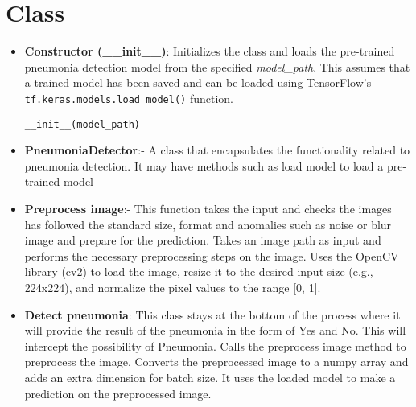 \section{Class}
\begin{itemize}
	\item\textbf{Constructor (\_\_init\_\_)}:
	Initializes the class and loads the pre-trained pneumonia detection model from the specified \textit{model\_path}. This assumes that a trained model has been saved and can be loaded using TensorFlow's \texttt{tf.keras.models.load\_model()} function.
	
	\texttt{\_\_init\_\_(model\_path)}
	
	\item\textbf{ PneumoniaDetector}:- A class that encapsulates the functionality related to pneumonia detection. It may have methods such as load model to load a pre-trained model
	
	
	\item\textbf{Preprocess image}:- This function takes the input and checks the images has followed the standard size, format and anomalies such as noise or blur image and prepare for the prediction. Takes an image path as input and performs the necessary preprocessing steps on the image. Uses the OpenCV library (cv2) to load the image, resize it to the desired input size (e.g., 224x224), and normalize the pixel values to the range [0, 1].
	
	\item\textbf{Detect pneumonia}: This class stays at the bottom of the  process where it will provide the result of the pneumonia in the form of Yes and No. This will intercept the possibility of Pneumonia. Calls the preprocess image method to preprocess the image. Converts the preprocessed image to a numpy array and adds an extra dimension for batch size. It uses the loaded model to make a prediction on the preprocessed image.
	
\end{itemize}


